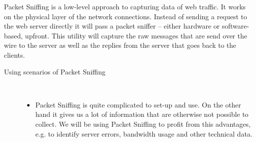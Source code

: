 Packet Sniffing is a low-level approach to capturing data of web traffic. It works on the physical layer of the network connections. Instead of sending a request to the web server directly it will pass a packet sniffer -- either hardware or software-based, upfront. This utility will capture the raw messages that are send over the wire to the server as well as the replies from the server that goes back to the clients.
\citep[p. 33-36]{Kaushik07}
\begin{description}
\item[Using scenarios of Packet Sniffing]~\par
  \begin{itemize}
	\item Packet Sniffing is quite complicated to set-up and use. On the other hand it gives us a lot of information that are otherwise not possible to collect. We will be using Packet Sniffing to profit from this advantages, e.g. to identify server errors, bandwidth usage and other technical data.
  \end{itemize}
\end{description}
